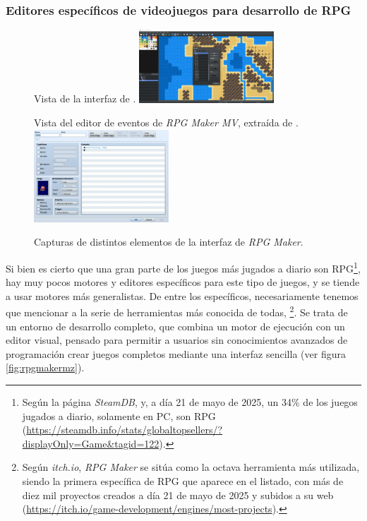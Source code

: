 \subsubsection{Editores específicos de videojuegos para desarrollo de RPG}
\begin{figure}[h]
	\centering
	\begin{SubFloat}
		{\label{fig:rpgmakermz}%
		Vista de la interfaz de \cite{rpgmakermz}.}%
		\includegraphics[width=0.45\textwidth]{Imagenes/Bitmap/rpgmakermz}%
	\end{SubFloat}
	\qquad
	\begin{SubFloat}
		{\label{fig:rpgmakerevent}%
		Vista del editor de eventos de \textit{RPG Maker MV}, extraída de \cite{rpgmakerevent}.}%
		\includegraphics[width=0.45\textwidth]{Imagenes/Bitmap/rpgmakereventeditor}%
	\end{SubFloat}
	\caption{Capturas de distintos elementos de la interfaz de \textit{RPG Maker}. \label{fig:rpgmaker}}
\end{figure}

Si bien es cierto que una gran parte de los juegos más jugados a diario son RPG\footnote{Según la página \textit{SteamDB}, y, a día 21 de mayo de 2025, un 34\% de los juegos jugados a diario, solamente en PC, son RPG (\url{https://steamdb.info/stats/globaltopsellers/?displayOnly=Game&tagid=122}).}, hay muy pocos motores y editores específicos para este tipo de juegos, y se tiende a usar motores más generalistas. De entre los específicos, necesariamente tenemos que mencionar a la serie de herramientas más conocida de todas, \cite{rpgmaker}\footnote{Según \textit{itch.io}, \textit{RPG Maker} se sitúa como la octava herramienta más utilizada, siendo la primera específica de RPG que aparece en el listado, con más de diez mil proyectos creados a día 21 de mayo de 2025 y subidos a su web (\url{https://itch.io/game-development/engines/most-projects}).}. Se trata de un entorno de desarrollo completo, que combina un motor de ejecución con un editor visual, pensado para permitir a usuarios sin conocimientos avanzados de programación crear juegos completos mediante una interfaz sencilla (ver figura \ref{fig:rpgmakermz}).

